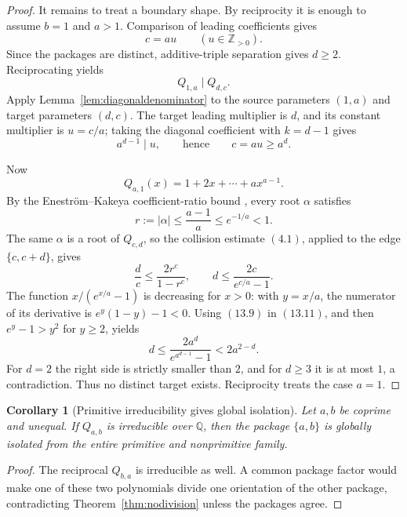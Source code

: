 \documentclass[11pt]{article}
\newtheorem{corollary}[theorem]{Corollary}
\theoremstyle{definition}
\newcommand{\Q}{\mathbb Q}
\newcommand{\Z}{\mathbb Z}
\begin{document}
\begin{proof}
It remains to treat a boundary shape.  By reciprocity it is enough to assume
\(b=1\) and \(a>1\).  Comparison of leading coefficients gives
\begin{equation}
 c=au\qquad(u\in\Z_{>0}).
 \tag{13.8}
\end{equation}
Since the packages are distinct, additive-triple separation gives \(d\geq2\).
Reciprocating yields
\[
 Q_{1,a}\mid Q_{d,c}.
\]
Apply Lemma~\ref{lem:diagonaldenominator} to the source parameters \((1,a)\)
and target parameters \((d,c)\).  The target leading multiplier is \(d\),
and its constant multiplier is \(u=c/a\); taking the diagonal coefficient
with \(k=d-1\) gives
\begin{equation}
 a^{d-1}\mid u,
 \qquad\text{hence}\qquad c=au\geq a^d.
 \tag{13.9}
\end{equation}

Now
\[
 Q_{a,1}(x)=1+2x+\cdots+a x^{a-1}.
\]
By the Enestr\"om--Kakeya coefficient-ratio bound
\cite{AndersonSaffVarga1979}, every root \(\alpha\) satisfies
\begin{equation}
 r:=|\alpha|\leq\frac{a-1}{a}\leq e^{-1/a}<1.
 \tag{13.10}
\end{equation}
The same \(\alpha\) is a root of \(Q_{c,d}\), so the collision estimate
\((4.1)\), applied to the edge \(\{c,c+d\}\), gives
\[
 \frac dc\leq\frac{2r^c}{1-r^c},
 \qquad
 d\leq\frac{2c}{e^{c/a}-1}.
 \tag{13.11}
\]
The function \(x/(e^{x/a}-1)\) is decreasing for \(x>0\): with
\(y=x/a\), the numerator of its derivative is
\(e^y(1-y)-1<0\).  Using \((13.9)\) in \((13.11)\), and then
\(e^y-1>y^2\) for \(y\geq2\), yields
\[
 d\leq\frac{2a^d}{e^{a^{d-1}}-1}<2a^{2-d}.
\]
For \(d=2\) the right side is strictly smaller than \(2\), and for
\(d\geq3\) it is at most \(1\), a contradiction.  Thus no distinct target
exists.  Reciprocity treats the case \(a=1\).
\end{proof}

\begin{corollary}[Primitive irreducibility gives global isolation]
\label{cor:primitiveisolation}
Let \(a,b\) be coprime and unequal.  If \(Q_{a,b}\) is irreducible over
\(\Q\), then the package \(\{a,b\}\) is globally isolated from the entire
primitive and nonprimitive family.
\end{corollary}

\begin{proof}
The reciprocal \(Q_{b,a}\) is irreducible as well.  A common package factor
would make one of these two polynomials divide one orientation of the other
package, contradicting Theorem~\ref{thm:nodivision} unless the packages agree.
\end{proof}
\end{document}
